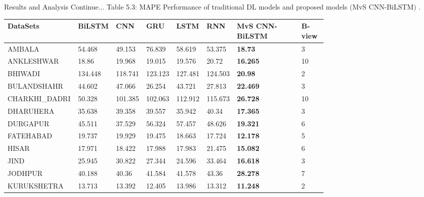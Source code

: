 \documentclass[12pt, aspectratio=169]{beamer}
\begin{document}
\begin{frame}{Results and Analysis \tiny{Continue...}}
	\centering
	\scriptsize {Table 5.3: MAPE Performance of traditional DL models and proposed models $($MvS CNN-BiLSTM$)$ .}\\
	\begin{table}
		\begin{tabular}[c]{|p{0.165\linewidth}|p{0.096\linewidth}|p{0.044\linewidth}|p{0.044\linewidth}|p{0.06\linewidth}|p{0.044\linewidth}|p{0.206\linewidth}|p{0.08\linewidth}|} \hline
		\footnotesize \textbf{DataSets} &\footnotesize  \textbf{ BiLSTM } &\footnotesize  \textbf{CNN} &\footnotesize  \textbf{GRU} &\footnotesize  \textbf{LSTM } &\footnotesize  \textbf{RNN} & \footnotesize  \textbf{MvS CNN-BiLSTM } & \footnotesize  \textbf{B-view} \\ \hline
		AMBALA         & 54.468       & 49.153    & 76.839    & 58.619     & 53.375    & \textbf{18.73}  & 3      \\ \hline
		ANKLESHWAR     & 18.86        & 19.968    & 19.015    & 19.576     & 20.72     & \textbf{16.265} & 10     \\ \hline
		BHIWADI        & 134.448      & 118.741   & 123.123   & 127.481    & 124.503   & \textbf{20.98}  & 2      \\ \hline
		BULANDSHAHR    & 44.602       & 47.066    & 26.254    & 43.721     & 27.813    & \textbf{22.469} & 3      \\ \hline
		CHARKHI\_DADRI & 50.328       & 101.385   & 102.063   & 112.912    & 115.673   & \textbf{26.728} & 10     \\ \hline
		DHARUHERA      & 35.638       & 39.358    & 39.557    & 35.942     & 40.34     & \textbf{17.365} & 3      \\ \hline
		DURGAPUR       & 45.511       & 37.529    & 56.324    & 57.457     & 48.626    & \textbf{19.321} & 6      \\ \hline
		FATEHABAD      & 19.737       & 19.929    & 19.475    & 18.663     & 17.724    & \textbf{12.178} & 5      \\ \hline
		HISAR          & 17.971       & 18.422    & 17.988    & 17.983     & 21.475    & \textbf{15.082} & 6      \\ \hline
		JIND           & 25.945       & 30.822    & 27.344    & 24.596     & 33.464    & \textbf{16.618} & 3      \\ \hline
		JODHPUR        & 40.188       & 40.36     & 41.584    & 41.578     & 43.36     & \textbf{28.278} & 7      \\ \hline
		KURUKSHETRA    & 13.713       & 13.392    & 12.405    & 13.986     & 13.312    & \textbf{11.248} & 2      \\ \hline

\end{tabular}
\end{table}
\end{frame}
\end{document}
